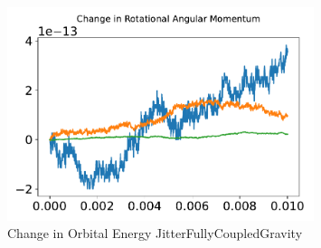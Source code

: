 \begin{figure}[htbp]\centerline{\includegraphics[width=0.80\textwidth]{AutoTeX/ChangeInOrbitalEnergyJitterFullyCoupledGravity}}\caption{Change in Orbital Energy JitterFullyCoupledGravity}\label{fig:ChangeInOrbitalEnergyJitterFullyCoupledGravity}\end{figure}